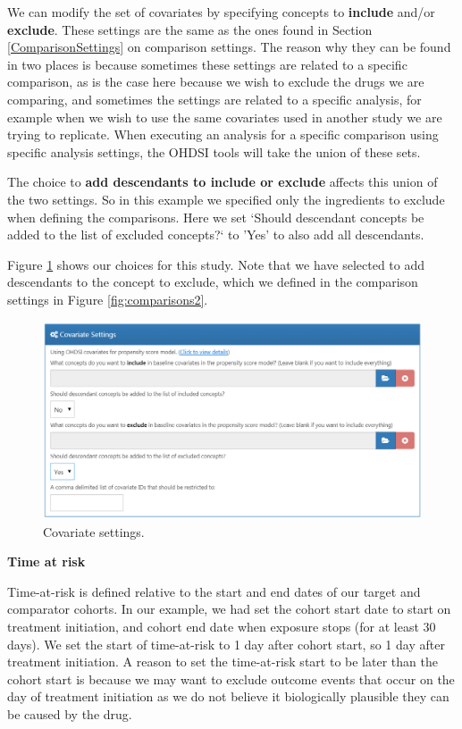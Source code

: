 \documentclass[]{book}
\begin{document}
We can modify the set of covariates by specifying concepts to
\textbf{include} and/or \textbf{exclude}. These settings are the same as
the ones found in Section \ref{ComparisonSettings} on comparison
settings. The reason why they can be found in two places is because
sometimes these settings are related to a specific comparison, as is the
case here because we wish to exclude the drugs we are comparing, and
sometimes the settings are related to a specific analysis, for example
when we wish to use the same covariates used in another study we are
trying to replicate. When executing an analysis for a specific
comparison using specific analysis settings, the OHDSI tools will take
the union of these sets.

The choice to \textbf{add descendants to include or exclude} affects
this union of the two settings. So in this example we specified only the
ingredients to exclude when defining the comparisons. Here we set
`Should descendant concepts be added to the list of excluded concepts?`
to 'Yes' to also add all descendants.

Figure \ref{fig:covariateSettings} shows our choices for this study.
Note that we have selected to add descendants to the concept to exclude,
which we defined in the comparison settings in Figure
\ref{fig:comparisons2}.

\begin{figure}

{\centering \includegraphics[width=1\linewidth]{images/PopulationLevelEstimation/covariateSettings} 

}

\caption{Covariate settings.}\label{fig:covariateSettings}
\end{figure}

\textbf{Time at risk}

Time-at-risk is defined relative to the start and end dates of our
target and comparator cohorts. In our example, we had set the cohort
start date to start on treatment initiation, and cohort end date when
exposure stops (for at least 30 days). We set the start of time-at-risk
to 1 day after cohort start, so 1 day after treatment initiation. A
reason to set the time-at-risk start to be later than the cohort start
is because we may want to exclude outcome events that occur on the day
of treatment initiation as we do not believe it biologically plausible
they can be caused by the drug.
\end{document}
